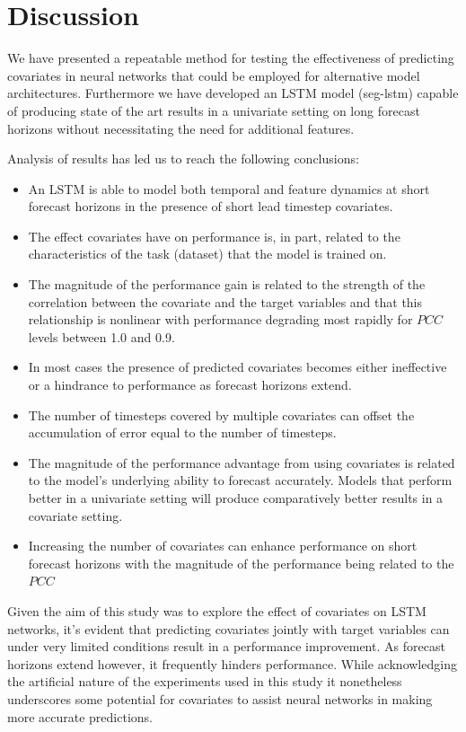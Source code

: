 \documentclass{article}
\newcommand{\pearson}{PCC}
\begin{document}
\section{Discussion}
We have presented a repeatable method for testing the effectiveness of predicting covariates in neural networks that could be employed for alternative 
model architectures. Furthermore we have developed an LSTM model (seg-lstm) capable of producing state of the art results in a univariate setting on 
long forecast horizons without necessitating the need for additional features. 

Analysis of results has led us to reach the following conclusions:
\begin{itemize}
\item An LSTM is able to model both temporal and feature dynamics at short forecast horizons in the presence of short lead timestep covariates.
\item The effect covariates have on performance is, in part, related to the characteristics of the task (dataset) that the model is trained on.
\item The magnitude of the performance gain is related to the strength of the correlation between the covariate and the target variables and that this relationship 
is nonlinear with performance degrading most rapidly for $\pearson$ levels between 1.0 and 0.9. 
\item In most cases the presence of predicted covariates becomes either ineffective or a hindrance to performance as forecast horizons extend.
\item The number of timesteps covered by multiple covariates can offset the accumulation of error equal to the number of timesteps. 
\item The magnitude of the performance advantage from using covariates is related to the model's underlying ability to forecast accurately. 
Models that perform better in a univariate setting will produce comparatively better results in a 
covariate setting.
\item Increasing the number of covariates can enhance performance on short forecast horizons with the magnitude of the performance being related to the $\pearson$
\end{itemize}

Given the aim of this study was to explore the effect of covariates on LSTM networks, it's evident that predicting covariates 
jointly with target variables can under very limited conditions result in a performance improvement. As forecast horizons extend however, it frequently 
hinders performance. While acknowledging the artificial nature of the experiments used in this study
it nonetheless underscores some potential for covariates to assist neural networks in making more accurate predictions. 
\end{document}
